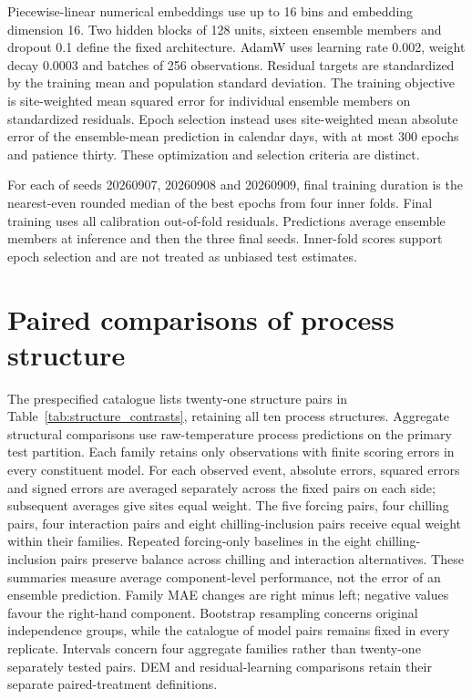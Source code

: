 \documentclass[a4paper,11pt]{article}
\let\OriginalSection\section
\renewcommand{\section}{\FloatBarrier\OriginalSection}
\begin{document}
Piecewise-linear numerical embeddings use up to 16 bins and embedding dimension
16. Two hidden blocks of 128 units, sixteen ensemble members and dropout 0.1
define the fixed architecture. AdamW uses learning rate 0.002, weight decay
0.0003 and batches of 256 observations. Residual targets are standardized by
the training mean and population standard deviation. The training objective is
site-weighted mean squared error for individual ensemble members on standardized
residuals. Epoch selection instead uses site-weighted mean absolute error of
the ensemble-mean prediction in calendar days, with at most 300 epochs and
patience thirty. These optimization and selection criteria are distinct.

For each of seeds 20260907, 20260908 and 20260909, final training duration is the
nearest-even rounded median of the best epochs from four inner folds. Final
training uses all calibration out-of-fold residuals. Predictions average ensemble
members at inference and then the three final seeds. Inner-fold scores support
epoch selection and are not treated as unbiased test estimates.

\section{Paired comparisons of process structure}

The prespecified catalogue lists twenty-one structure pairs in Table~\ref{tab:structure_contrasts}, retaining all ten process structures. Aggregate structural comparisons use raw-temperature process predictions on the primary test partition. Each family retains only observations with finite scoring errors in every constituent model. For each observed event, absolute errors, squared errors and signed errors are averaged separately across the fixed pairs on each side; subsequent averages give sites equal weight. The five forcing pairs, four chilling pairs, four interaction pairs and eight chilling-inclusion pairs receive equal weight within their families. Repeated forcing-only baselines in the eight chilling-inclusion pairs preserve balance across chilling and interaction alternatives. These summaries measure average component-level performance, not the error of an ensemble prediction. Family MAE changes are right minus left; negative values favour the right-hand component. Bootstrap resampling concerns original independence groups, while the catalogue of model pairs remains fixed in every replicate. Intervals concern four aggregate families rather than twenty-one separately tested pairs. DEM and residual-learning comparisons retain their separate paired-treatment definitions.
\end{document}
